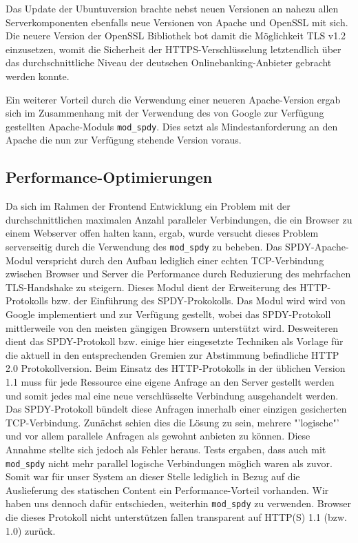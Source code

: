 Das Update der Ubuntuversion brachte nebst neuen Versionen an nahezu allen Serverkomponenten ebenfalls neue Versionen von Apache und OpenSSL mit sich. Die neuere Version der OpenSSL Bibliothek bot damit die Möglichkeit TLS v1.2 einzusetzen, womit die Sicherheit der HTTPS-Verschlüsselung letztendlich über das durchschnittliche Niveau der deutschen Onlinebanking-Anbieter gebracht werden konnte.

Ein weiterer Vorteil durch die Verwendung einer neueren Apache-Version ergab sich im Zusammenhang mit der Verwendung des von Google zur Verfügung gestellten Apache-Moduls \texttt{mod\_spdy}. Dies setzt als Mindestanforderung an den Apache die nun zur Verfügung stehende Version voraus.

\subsection{Performance-Optimierungen\label{sec:performance_opt}}
Da sich im Rahmen der Frontend Entwicklung ein Problem mit der durchschnittlichen maximalen Anzahl paralleler Verbindungen, die ein Browser zu einem Webserver offen halten kann, ergab, wurde versucht dieses Problem serverseitig durch die Verwendung des \texttt{mod\_spdy} zu beheben.
Das SPDY-Apache-Modul verspricht durch den Aufbau lediglich einer echten TCP-Verbindung zwischen Browser und Server die Performance durch Reduzierung des mehrfachen TLS-Handshake zu steigern. Dieses Modul dient der Erweiterung des HTTP-Protokolls bzw. der Einführung des SPDY-Prokokolls. Das Modul wird wird von Google implementiert und zur Verfügung gestellt, wobei das SPDY-Protokoll mittlerweile von den meisten gängigen Browsern unterstützt wird. Desweiteren dient das SPDY-Protokoll bzw. einige hier eingesetzte Techniken als Vorlage für die aktuell in den entsprechenden Gremien zur Abstimmung befindliche HTTP 2.0 Protokollversion.
Beim Einsatz des HTTP-Protokolls in der üblichen Version 1.1 muss für jede Ressource eine eigene Anfrage an den Server gestellt werden und somit jedes mal eine neue verschlüsselte Verbindung ausgehandelt werden. Das SPDY-Protokoll bündelt diese Anfragen innerhalb einer einzigen gesicherten TCP-Verbindung. Zunächst schien dies die Lösung zu sein, mehrere "'logische"' und vor allem parallele Anfragen als gewohnt anbieten zu können. Diese Annahme stellte sich jedoch als Fehler heraus. Tests ergaben, dass auch mit \texttt{mod\_spdy} nicht mehr parallel logische Verbindungen möglich waren als zuvor.
Somit war für unser System an dieser Stelle lediglich in Bezug auf die Auslieferung des statischen Content ein Performance-Vorteil vorhanden. Wir haben uns dennoch dafür entschieden, weiterhin \texttt{mod\_spdy} zu verwenden. Browser die dieses Protokoll nicht unterstützen fallen transparent auf HTTP(S) 1.1 (bzw. 1.0) zurück. 

